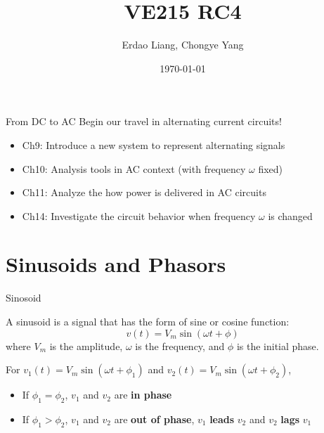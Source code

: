 \documentclass{beamer}
\title[VE215 RC3]{VE215 RC4}
\author{Erdao Liang, Chongye Yang}
\institute[UM-SJTU JI] 
{UM-SJTU JI}
\date{\today}
\begin{document}

\begin{frame}
\titlepage %
\end{frame}


\begin{frame}{From DC to AC}
    Begin our travel in alternating current circuits!
    \begin{itemize}
        \item Ch9: Introduce a new system to represent alternating signals
        \item Ch10: Analysis tools in AC context (with frequency $\omega$ fixed)
        \item Ch11: Analyze the how power is delivered in AC circuits
        \item Ch14: Investigate the circuit behavior when frequency $\omega$ is changed
    \end{itemize}
\end{frame}


\section{Sinusoids and Phasors}

\begin{frame}{Sinosoid}

A sinusoid is a signal that has the form of sine or cosine function:
$$ v(t) = V_m \sin(\omega t + \phi)$$
where $V_m$ is the amplitude, $\omega$ is the frequency, and $\phi$ is the initial phase.

\vspace{1cm}

For $v_1(t)=V_m \sin(\omega t + \phi_1)$ and $v_2(t)=V_m\sin(\omega t + \phi_2)$,
\begin{itemize}
    \item If $\phi_1 = \phi_2$, $v_1$ and $v_2$ are \textbf{in phase}
    \item If $\phi_1 > \phi_2$, $v_1$ and $v_2$ are \textbf{out of phase}, $v_1$ \textbf{leads} $v_2$ and $v_2$ \textbf{lags} $v_1$
\end{itemize}

    
\end{frame}
\end{document}
